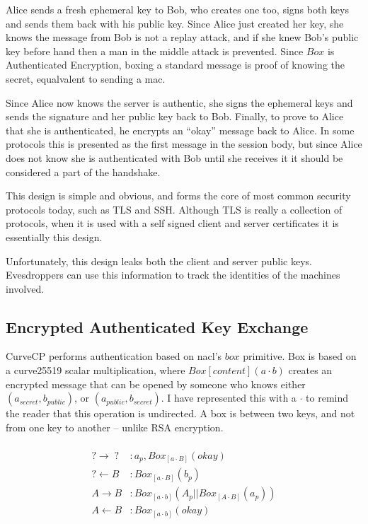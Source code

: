 \documentclass[12pt]{article}
\begin{document}
Alice sends a fresh ephemeral key to Bob, who
creates one too, signs both keys and sends them back with his
public key. Since Alice just created her key, she knows the message
from Bob is not a replay attack, and if she knew Bob's public key
before hand then a man in the middle attack is prevented.
Since $Box$ is Authenticated Encryption, boxing a standard message
is proof of knowing the secret, equalvalent to sending a mac.

Since Alice now knows the server is authentic, she signs
the ephemeral keys and sends the signature and her public key back to
Bob. Finally, to prove to Alice that she is authenticated,
he encrypts an ``okay'' message back to Alice. In some protocols
this is presented as the first message in the session body,
but since Alice does not know she is authenticated with Bob
until she receives it it should be considered a part of the handshake.

This design is simple and obvious, and forms the core of most
common security protocols today, such as TLS and SSH. Although TLS
is really a collection of protocols, when it is used with a self
signed client and server certificates it is essentially this design.

Unfortunately, this design leaks both the client and server
public keys. Evesdroppers can use this information to track the
identities of the machines involved.

\subsection{Encrypted Authenticated Key Exchange}

CurveCP performs authentication based on nacl's\cite{nacl} $box$ primitive.
Box is based on a curve25519 scalar multiplication,
where $Box[content](a\cdot b)$ creates an encrypted message
that can be opened by someone who knows either $(a_{secret}, b_{public})$,
or $(a_{public}, b_{secret})$.
I have represented this with a $\cdot$ to remind the reader
that this operation is undirected. A box is
between two keys, and not from one key to another -- unlike RSA encryption.

$$
\begin{align*}
\\
    ? \to \;?\;   &: a_p, Box_{[a\cdot B]}(okay) \\
    ? \gets B &: Box_{[a\cdot B]}(b_p) \\
    A \to B   &: Box_{[a\cdot b]}(A_p||Box_{[A \cdot B]}(a_p))\\
    A \gets B &: Box_{[a\cdot b]}(okay) \\
\\
\end{align*}
$$
\end{document}

